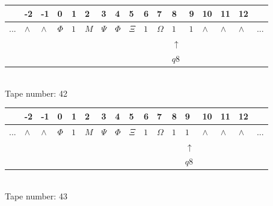 \documentclass[11pt]{article}
\begin{document}
\begin{table}[H]
\centering
\begin{tabular}{lllllllllllllllll}
 & -2 & -1 & 0 & 1 & 2 & 3 & 4 & 5 & 6 & 7 & 8 & 9 & 10 & 11 & 12 & \\
\hline
$...$ & \multicolumn{1}{|l|}{$\wedge$} & \multicolumn{1}{|l|}{$\wedge$} & \multicolumn{1}{|l|}{$\Phi$} & \multicolumn{1}{|l|}{$1$} & \multicolumn{1}{|l|}{$M$} & \multicolumn{1}{|l|}{$\Psi$} & \multicolumn{1}{|l|}{$\Phi$} & \multicolumn{1}{|l|}{$\Xi$} & \multicolumn{1}{|l|}{$1$} & \multicolumn{1}{|l|}{$\Omega$} & \multicolumn{1}{|l|}{$1$} & \multicolumn{1}{|l|}{$1$} & \multicolumn{1}{|l|}{$\wedge$} & \multicolumn{1}{|l|}{$\wedge$} & \multicolumn{1}{|l|}{$\wedge$} & $...$\\
\hline
&  &  &  &  &  &  &  &  &  &  & $\uparrow$ &  &  &  &  &  \\
&  &  &  &  &  &  &  &  &  &  & $ q8 $ &  &  &  &  &  \\
\end{tabular}
\\
Tape number: 42
\noindent\makebox[\linewidth]{\hdashrule{\textwidth}{1pt}{1pt}}\end{table}

\begin{table}[H]
\centering
\begin{tabular}{lllllllllllllllll}
 & -2 & -1 & 0 & 1 & 2 & 3 & 4 & 5 & 6 & 7 & 8 & 9 & 10 & 11 & 12 & \\
\hline
$...$ & \multicolumn{1}{|l|}{$\wedge$} & \multicolumn{1}{|l|}{$\wedge$} & \multicolumn{1}{|l|}{$\Phi$} & \multicolumn{1}{|l|}{$1$} & \multicolumn{1}{|l|}{$M$} & \multicolumn{1}{|l|}{$\Psi$} & \multicolumn{1}{|l|}{$\Phi$} & \multicolumn{1}{|l|}{$\Xi$} & \multicolumn{1}{|l|}{$1$} & \multicolumn{1}{|l|}{$\Omega$} & \multicolumn{1}{|l|}{$1$} & \multicolumn{1}{|l|}{$1$} & \multicolumn{1}{|l|}{$\wedge$} & \multicolumn{1}{|l|}{$\wedge$} & \multicolumn{1}{|l|}{$\wedge$} & $...$\\
\hline
&  &  &  &  &  &  &  &  &  &  &  & $\uparrow$ &  &  &  &  \\
&  &  &  &  &  &  &  &  &  &  &  & $ q8 $ &  &  &  &  \\
\end{tabular}
\\
Tape number: 43
\noindent\makebox[\linewidth]{\hdashrule{\textwidth}{1pt}{1pt}}\end{table}
\end{document}
